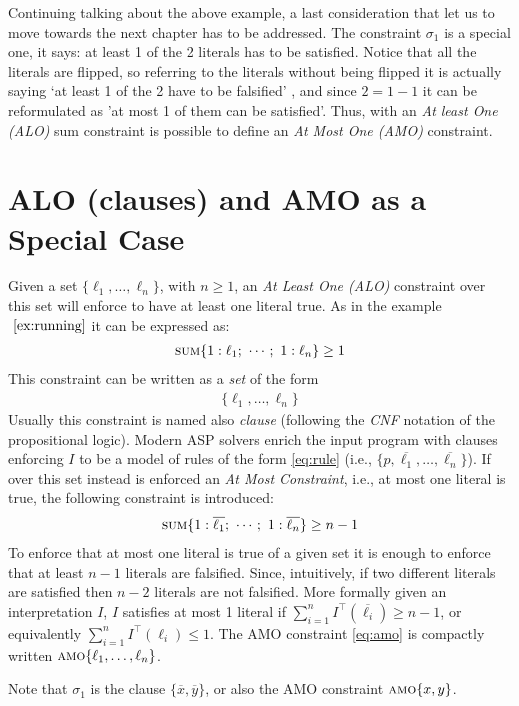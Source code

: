 Continuing talking about the above example, a last consideration that let us to move towards the next 
chapter has to be addressed.
The constraint $\sigma_1$ is a special one, it says: at least 1 of the 2 literals
has to be satisfied. Notice that all the literals are flipped, 
so referring to the literals without being flipped it is 
actually saying `at least 1 of the 2 have to be falsified' , and since $2 = 1 - 1$ it can be 
reformulated as 'at most 1 of them can be satisfied'.
Thus, with an \textit{At least One (ALO)} sum constraint is possible to define an \textit{At Most One (AMO)}
constraint.

\section{ALO (clauses) and AMO as a Special Case}
\label{sec:bg-clauses_AMO}

Given a set $\{\ell_1, \hdots, \ell_n\}$, with $n \ge 1$, an \textit{At Least One (ALO)} 
constraint over this set will enforce to have at least one literal true.
As in the example $~\ref{ex:running}$ it can be expressed as:
\begin{align}\label{eq:ALO}
    \textsc{sum}\{1 : \ell_1;\ \cdots;\ 1 : \ell_n\} \geq 1
\end{align}
This constraint can be written as a \textit{set} of the form 
\begin{align}
    \label{eq:clauses}
    \{\ell_1, \hdots, \ell_n\}
\end{align} 
Usually this constraint is named also \textit{clause} (following the \textit{CNF} notation 
of the propositional logic).
Modern ASP solvers enrich the input program with clauses enforcing $I$ to be a 
model of rules of the form \eqref{eq:rule} (i.e., $\{p, \overline{\ell_1}, \ldots, \overline{\ell_n}\}$).
If over this set instead is enforced an \textit{At Most Constraint}, i.e., at most 
one literal is true, the following constraint is introduced:
\begin{align}\label{eq:amo}
    \textsc{sum}\{1 : \overline{\ell_1};\ \cdots;\ 1 : \overline{\ell_n}\} \geq n - 1
\end{align}
To enforce that at most
one literal is true of a given set it is enough to enforce that 
at least $n-1$ literals are falsified.
Since, intuitively, if two different literals are satisfied then $n-2$ literals are not falsified.
More formally given an interpretation $I$, $I$ satisfies at most 1 literal if 
$\sum_{i = 1}^{n}{I^{\top}(\overline{\ell_i})} \geq n - 1$, or equivalently
$\sum_{i = 1}^{n}{I^{\top}(\ell_i)} \leq 1$.
The AMO constraint \eqref{eq:amo} is compactly written $\textsc{amo}\{\ell_1,\ldots,\ell_n\}$.
\begin{example}
    Note that $\sigma_1$ is the clause $\{\overline{x}, \overline{y}\}$, or also the AMO constraint $\textsc{amo}\{x, y\}$.
\end{example}

